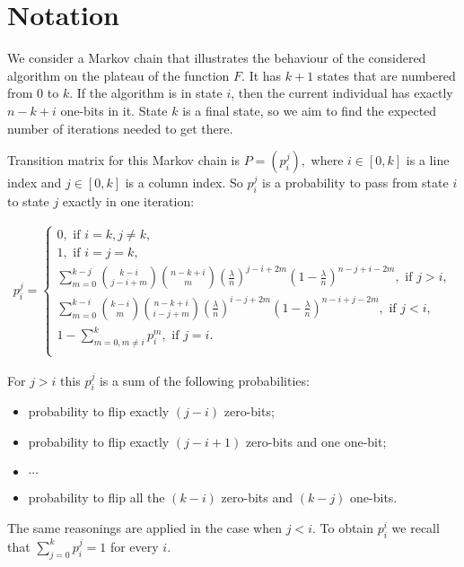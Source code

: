 \documentclass{article}
\begin{document}
\section{Notation}

We consider a Markov chain that illustrates the behaviour of the considered algorithm on the plateau of the function $F$. It has $k + 1$ states that are numbered from $0$ to $k$. If the algorithm is in state $i$, then the current individual has exactly $n - k + i$ one-bits in it. State $k$ is a final state, so we aim to find the expected number of iterations needed to get there.

Transition matrix for this Markov chain is $P = (p_i^j),$ where $i \in [0, k]$ is a line index and $j \in [0, k]$ is a column index. So $p_i^j$ is a probability to pass from state $i$ to state $j$ exactly in one iteration:

\begin{align*}
  p_i^j = \begin{cases}
    0, \text{ if } i = k, j \ne k, \\
    1, \text{ if } i = j = k, \\
    \sum\limits_{m = 0}^{k - j} \binom{k - i}{j - i + m} \binom{n - k + i}{m} \left(\frac{\lambda}{n}\right)^{j - i + 2m} \left(1 - \frac{\lambda}{n}\right)^{n - j + i - 2m}, \text{ if } j > i, \\
      \sum\limits_{m = 0}^{k - i} \binom{k - i}{m} \binom{n - k + i}{i - j + m} \left(\frac{\lambda}{n}\right)^{i - j + 2m} \left(1 - \frac{\lambda}{n}\right)^{n - i + j - 2m}, \text{ if } j < i, \\
      1 - \sum\limits_{m = 0, m \ne i}^k p_i^m, \text{ if } j = i. \\
  \end{cases}
\end{align*}

For $j > i$ this $p_i^j$ is a sum of the following probabilities:
\begin{itemize}
  \item probability to flip exactly $(j - i)$ zero-bits;
  \item probability to flip exactly $(j - i + 1)$ zero-bits and one one-bit;
  \item $\cdots$
  \item probability to flip all the $(k - i)$ zero-bits and $(k - j)$ one-bits.
\end{itemize}

The same reasonings are applied in the case when $j < i$. To obtain $p_i^i$ we recall that $\sum\limits_{j = 0}^{k} p_i^j = 1$ for every $i.$
\end{document}
